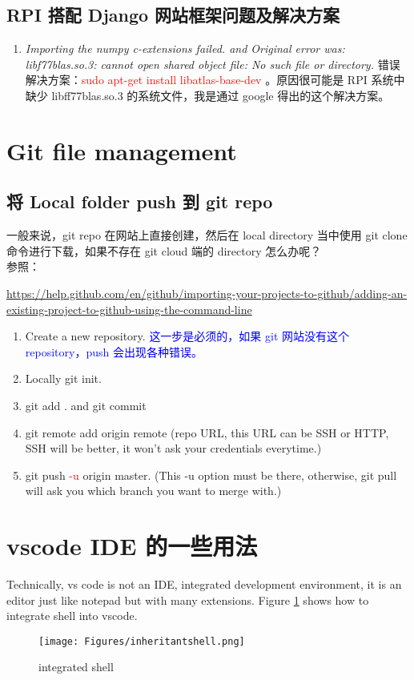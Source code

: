 \documentclass[UTF8,fancyhdr,a4paper]{ctexart}
\begin{document}
\subsection{RPI 搭配 Django 网站框架问题及解决方案}
\begin{enumerate}
      \item \emph{Importing the numpy c-extensions failed. and Original error was: libf77blas.so.3: cannot open shared object file: No such file or directory.} 错误解决方案：\textcolor{red}{sudo apt-get install libatlas-base-dev} 。原因很可能是 RPI 系统中缺少 libff77blas.so.3 的系统文件，我是通过 google 得出的这个解决方案。
\end{enumerate}






\newpage
\section{Git file management}
\subsection{将 Local folder push 到 git repo}
一般来说，git repo 在网站上直接创建，然后在 local directory 当中使用 git clone 命令进行下载，如果不存在 git cloud 端的 directory 怎么办呢？\\
参照：\begin{sloppypar}\url{https://help.github.com/en/github/importing-your-projects-to-github/adding-an-existing-project-to-github-using-the-command-line}\end{sloppypar}
\begin{enumerate}
      \item Create a new repository. \textcolor{blue}{这一步是必须的，如果 git 网站没有这个 repository，push 会出现各种错误。}
      \item Locally git init.
      \item git add . and git commit
      \item git remote add origin remote (repo URL, this URL can be SSH or HTTP, SSH will be better, it won't ask your credentials everytime.)
      \item git push \textcolor{red}{-u} origin master. (This -u option must be there, otherwise, git pull will ask you which branch you want to merge with.)
\end{enumerate}


\newpage
\section{vscode IDE 的一些用法}
Technically, vs code is not an IDE, integrated development environment, it is an editor just like notepad but with many extensions.
Figure \ref{integrated shell} shows how to integrate shell into vscode.
\begin{figure}[h]
      \centering
      \texttt{[image: Figures/inheritantshell.png]}
      \caption{integrated shell}
      \label{integrated shell}
\end{figure}
\end{document}
